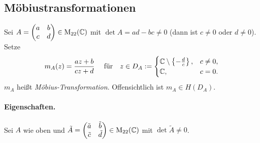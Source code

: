 \documentclass[a4paper,twoside,DIV15,BCOR12mm]{scrbook}
\begin{document}
\subsection{Möbiustransformationen}

\noindent Sei $A = \left(\!\!\!\begin{array}{c c}a&b\\c&d\end{array}\!\!\!\right) \in \mathrm{M}_{22}(\mathbb{C})$ mit $\det A = ad-bc \neq 0$ (dann ist $c\neq0$ oder
$d\neq0$). Setze
\[m_A(z) = \frac{az+b}{cz+d} \quad \  \text{für} \quad z \in D_A :=
\begin{cases} \mathbb{C} \setminus \left\{-\frac{d}{c}\right\} ,& c \neq 0, \\ \mathbb{C} ,& c = 0. \end{cases}\]
$m_A$ heißt \emph{Möbius-Transformation}. Offensichtlich ist $m_A \in H(D_A)$.
\paragraph{Eigenschaften.} Sei $A$ wie oben und $\tilde{A} = \left(\!\!\!\begin{array}{c c}\tilde{a}&\tilde{b}\\\tilde{c}&\tilde{d}\end{array}\!\!\!\right) \in
\mathrm{M}_{22}(\mathbb{C})$ mit $\det \tilde{A} \neq 0$.
\end{document}

